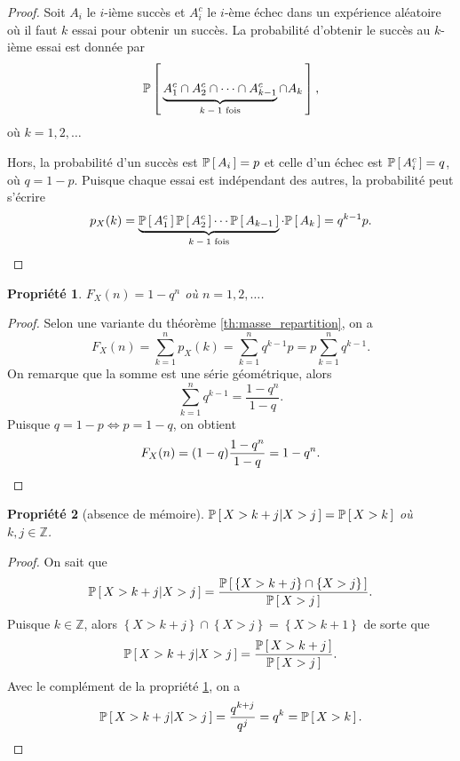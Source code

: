 \documentclass[11pt]{article}
\renewcommand\P[1]{%
	\ensuremath{%
		\mathbb{P}\left[\,#1\,\right]%
	}%
}%
\newcommand\Pg[2]{%
	\ensuremath{%
		\mathbb{P}\left[\,#1\middle\rvert#2\,\right]%
	}%
}%
\newtheorem{property}{Propriété}
\theoremstyle{remark}
\theoremstyle{definition}
\begin{document}
\begin{proof}
	Soit $A_i$ le $i$-ième succès et $A_i^c$ le $i$-ème échec dans un
	expérience aléatoire où il faut $k$ essai pour obtenir un succès. La
	probabilité d'obtenir le succès au $k$-ième essai est donnée par
	\begin{equation*}
		\P{
			\underbrace{A_1^c\cap A_2^c\cap\cdots\cap A_{k-1}^c}_
			\text{$k-1$ fois}\cap A_k
		},
	\end{equation*}
	où $k=1,2,\dots$

	Hors, la probabilité d'un succès est $\P{A_i}=p$ et celle d'un échec
	est $\P{A_i^c}=q$, où $q=1-p$. Puisque chaque essai est indépendant des
	autres, la probabilité peut s'écrire
	\begin{equation*}
		p_X(k)=
		\underbrace{\P{A_1^c}\P{A_2^c}\cdots\P{A_{k-1}}}_\text{$k-1$ fois}
		\cdot\P{A_k}=q^{k-1}p.\qedhere
	\end{equation*}
\end{proof}

\begin{property}\label{pr:repartition_geo}
	$F_X(n)=1-q^n$ où $n=1,2,\dots$.
\end{property}

\begin{proof}
	Selon une variante du théorème \ref{th:masse_repartition}, on a
	\begin{equation*}
		F_X(n)=\sum_{k=1}^np_X(k)=\sum_{k=1}^nq^{k-1}p=p\sum_{k=1}^nq^{k-1}.
	\end{equation*}
	On remarque que la somme est une série géométrique, alors
	\begin{equation*}
		\sum_{k=1}^nq^{k-1}=\frac{1-q^n}{1-q}.
	\end{equation*}
	Puisque $q=1-p\Leftrightarrow p=1-q$, on obtient
	\begin{equation*}
		F_X(n)=(1-q)\frac{1-q^n}{1-q}=1-q^n.\qedhere
	\end{equation*}
\end{proof}

\begin{property}[absence de mémoire]
	$\Pg{X>k+j}{X>j}=\P{X>k}$ où $k,j\in\mathbb{Z}$.
\end{property}

\begin{proof}
	On sait que
	\begin{equation*}
		\Pg{X>k+j}{X>j}=\frac{\P{
			\left\{X>k+j\right\}\cap
	   		\left\{X>j\right\}}}{\P{X>j}}.
	\end{equation*}
	Puisque $k\in\mathbb{Z}$, alors $\left\{X>k+j\right\}\cap\left\{X>j\right\}
	=\left\{X>k+1\right\}$ de sorte que
	\begin{equation*}
		\Pg{X>k+j}{X>j}=\frac{\P{X>k+j}}{\P{X>j}}.
	\end{equation*}
	Avec le complément de la propriété \ref{pr:repartition_geo}, on a
	\begin{equation*}
		\Pg{X>k+j}{X>j}=\frac{q^{k+j}}{q^{j}}=q^{k}=\P{X>k}.\qedhere
	\end{equation*}
\end{proof}
\end{document}
